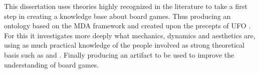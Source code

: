 \begin{foreignabstract}

This dissertation uses theories highly recognized in the literature to take a first step in creating a knowledge base about board games. Thus producing an ontology based on the MDA framework \citet{Hunicke2004} and created upon the precepts of UFO \citet{guizzardi_ontological_2005}. For this it investigates more deeply what mechanics, dynamics and aesthetics are, using as much practical knowledge of the people involved as strong theoretical basis such as \citet{ekman_are_basic_emotions_nodate} and \citet{dillon_way_2010}. Finally producing an artifact to be used to improve the understanding of board games.

\end{foreignabstract}
